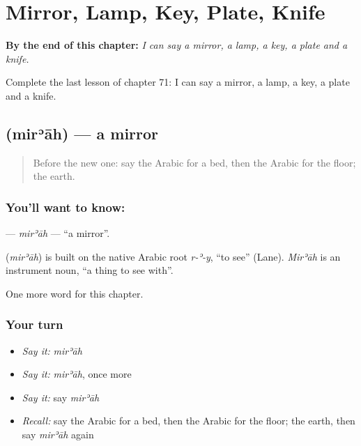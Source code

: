 
\chapter{Mirror, Lamp, Key, Plate, Knife}
\label{ch:ar-mirror-lamp-key-plate-knife}

\begin{chapteropening}
\textbf{By the end of this chapter:} \emph{I can say a mirror, a lamp, a key, a plate and a knife.}

Complete the last lesson of chapter 71: I can say a mirror, a lamp, a key, a plate and a knife.
\end{chapteropening}

\section[\texorpdfstring{\ar{مرآة} (mirʾāh)}{مرآة (mirʾāh)}]{ (mirʾāh) — a mirror}

\label{lesson:AR-C71-mirah}



\begin{quote}
Before the new one: say the Arabic for a bed, then the Arabic for the floor; the earth.
\end{quote}

\subsection*{You'll want to know: }
\textbf{} — \emph{mirʾāh} — \textquotedblleft{}a mirror\textquotedblright{}.

\begin{cousinweb}
\textbf{} (\emph{mirʾāh}) is built on the native Arabic root \emph{r-ʾ-y}, \textquotedblleft{}to see\textquotedblright{} (Lane). \emph{Mirʾāh} is an instrument noun, \textquotedblleft{}a thing to see with\textquotedblright{}.
\end{cousinweb}

\begin{grammarlens}[title={What you've built}]
One more word for this chapter.
\end{grammarlens}

\subsection*{Your turn}
\begin{itemize}
\raggedright
  \item \emph{Say it:} \emph{mirʾāh}
  \item \emph{Say it:} \emph{mirʾāh}, once more
  \item \emph{Say it:} say \emph{mirʾāh}
  \item \emph{Recall:} say the Arabic for a bed, then the Arabic for the floor; the earth, then say \emph{mirʾāh} again
\end{itemize}

